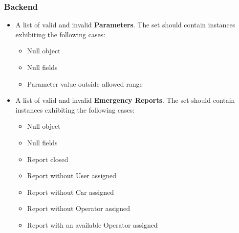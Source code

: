 		
		
		\subsubsection{Backend}
		
		\begin{itemize}
			\item A list of valid and invalid \textbf{Parameters}. The set should contain instances exhibiting the following cases:
				\begin{itemize}
					\item Null object
					\item Null fields
					\item Parameter value outside allowed range
				\end{itemize}
		\end{itemize}
		
		\begin{itemize}
			\item A list of valid and invalid \textbf{Emergency Reports}. The set should contain instances exhibiting the following cases:
				\begin{itemize}
					\item Null object
					\item Null fields
					\item Report closed
					\item Report without User assigned
					\item Report without Car assigned
					\item Report without Operator assigned
					\item Report with an available Operator assigned
				\end{itemize}
		\end{itemize}